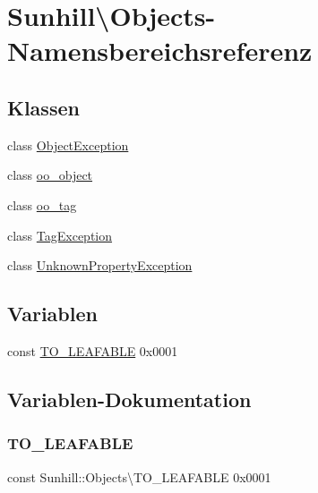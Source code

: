 \hypertarget{namespaceSunhill_1_1Objects}{}\section{Sunhill\textbackslash{}Objects-\/\+Namensbereichsreferenz}
\label{namespaceSunhill_1_1Objects}
\subsection*{Klassen}
\begin{DoxyCompactItemize}
\item 
class \hyperlink{classSunhill_1_1Objects_1_1ObjectException}{Object\+Exception}
\item 
class \hyperlink{classSunhill_1_1Objects_1_1oo__object}{oo\+\_\+object}
\item 
class \hyperlink{classSunhill_1_1Objects_1_1oo__tag}{oo\+\_\+tag}
\item 
class \hyperlink{classSunhill_1_1Objects_1_1TagException}{Tag\+Exception}
\item 
class \hyperlink{classSunhill_1_1Objects_1_1UnknownPropertyException}{Unknown\+Property\+Exception}
\end{DoxyCompactItemize}
\subsection*{Variablen}
\begin{DoxyCompactItemize}
\item 
const \hyperlink{namespaceSunhill_1_1Objects_a31ec8901d9505910a094aa39b17968ff}{T\+O\+\_\+\+L\+E\+A\+F\+A\+B\+LE} 0x0001
\end{DoxyCompactItemize}


\subsection{Variablen-\/\+Dokumentation}
\mbox{\label{namespaceSunhill_1_1Objects_a31ec8901d9505910a094aa39b17968ff}} 
\subsubsection{\texorpdfstring{T\+O\+\_\+\+L\+E\+A\+F\+A\+B\+LE}{TO\_LEAFABLE}}
{\footnotesize\ttfamily const Sunhill\+::\+Objects\textbackslash{}\+T\+O\+\_\+\+L\+E\+A\+F\+A\+B\+LE 0x0001}

